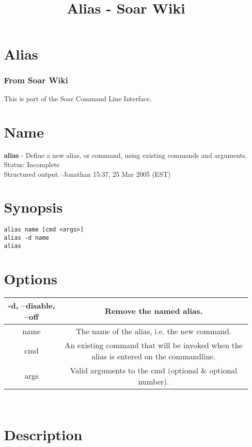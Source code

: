 \documentclass[10pt]{article}
\title{Alias - Soar Wiki}
\begin{document}
\section*{Alias}
\subsubsection*{From Soar Wiki}


 This is part of the Soar Command Line Interface. 
\section*{ Name }


 \textbf{alias}
 - Define a new alias, or command, using existing commands and arguments.\\ 
 Status: Incomplete\\ 
Structured output.--Jonathan 15:37, 25 Mar 2005 (EST) 
\section*{ Synopsis }


  \begin{verbatim}
alias name [cmd <args>]
alias -d name
alias

\end{verbatim}



 
\section*{ Options }


\begin{tabular}{|c|c|}
\hline 
 -d, --disable, --off  & Remove the named alias.  \\
 \hline 
 name  & The name of the alias, i.e. the new command.  \\
 \hline 
 cmd  & An existing command that will be invoked when the alias is entered on the commandline.  \\
 \hline 
 args  & Valid arguments to the cmd (optional \& optional number).  \\
 \hline 

\end{tabular}



 \\ 

\section*{ Description }
\end{document}
